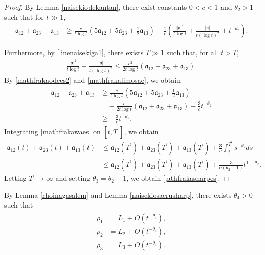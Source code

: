 \documentclass[10pt,a4paper]{amsart}
\numberwithin{equation}{section}
\begin{document}
\begin{proof}
By Lemma \ref{naisekiodekantan}, there exist constants $0<c<1$ and $\theta_2>1$ such that for $t\gg 1$,
\begin{align}\label{mathfrakaodees2}
\dot{\mathfrak{a}}_{12}+\dot{\mathfrak{a}}_{23}+\dot{\mathfrak{a}}_{13}&\geq  \frac{c}{t\log{t}}\left(5\mathfrak{a}_{12}+5\mathfrak{a}_{23}+\frac{1}{2}\mathfrak{a}_{13}\right)-\frac{1}{c}\left(\frac{|\mathfrak{a}|^2}{t\log{t}}+\frac{|\mathfrak{a}|}{t(\log{t})^2}+t^{-\theta_2}\right).
\end{align}

Furthermore, by \eqref{linenaisekiga1}, there exists $T\gg 1$ such that, for all $t>T$,
\begin{align}\label{mathfrakalimosae}
\frac{|\mathfrak{a}|^2}{t\log{t}}+\frac{|\mathfrak{a}|}{t(\log{t})^2}\leq \frac{c^2}{2t\log{t}}\left(\mathfrak{a}_{12}+\mathfrak{a}_{23}+\mathfrak{a}_{13}\right).
\end{align}
By \eqref{mathfrakaodees2} and \eqref{mathfrakalimosae}, we obtain
\begin{align}\label{mathfrakawaes}
\begin{aligned}
\dot{\mathfrak{a}}_{12}+\dot{\mathfrak{a}}_{23}+\dot{\mathfrak{a}}_{13}&\geq  \frac{c}{t\log{t}}\left(5\mathfrak{a}_{12}+5\mathfrak{a}_{23}+\frac{1}{2}\mathfrak{a}_{13}\right)
\\
&\quad-\frac{c}{2t\log{t}}\left(\mathfrak{a}_{12}+\mathfrak{a}_{23}+\mathfrak{a}_{13}\right)-\frac{3}{c}t^{-\theta_2}
\\
&\geq -\frac{3}{c}t^{-\theta_2}.
\end{aligned}
\end{align}
Integrating \eqref{mathfrakawaes} on $[t,T^{\prime}]$, we obtain
\begin{align*}
\mathfrak{a}_{12}(t)+\mathfrak{a}_{23}(t)+\mathfrak{a}_{13}(t)&\leq \mathfrak{a}_{12}(T^{\prime})+\mathfrak{a}_{23}(T^{\prime})+\mathfrak{a}_{13}(T^{\prime})+\frac{3}{c}\int_t^{T^{\prime}}s^{-\theta_2}ds
\\
&\leq \mathfrak{a}_{12}(T^{\prime})+\mathfrak{a}_{23}(T^{\prime})+\mathfrak{a}_{13}(T^{\prime})+\frac{3}{c\left(\theta_2-1\right)}t^{1-\theta_2}.
\end{align*}
Letting $T^{\prime}\to\infty$ and setting $\theta_3=\theta_2-1$, we obtain \eqref{,athfrakasharpes}.


\end{proof}




By Lemma \ref{rhoinagasalem} and Lemma \ref{naisekiosaerusharp}, there exists $\theta_4>0$ such that 
\begin{align}\label{rhokaizen}
\begin{aligned}
\rho_1&=L_1+O\left(t^{-\theta_4}\right),
\\
\rho_2&=L_2+O\left(t^{-\theta_4}\right),
\\
\rho_3&=L_3+O\left(t^{-\theta_4}\right).
\end{aligned}
\end{align}
\end{document}
